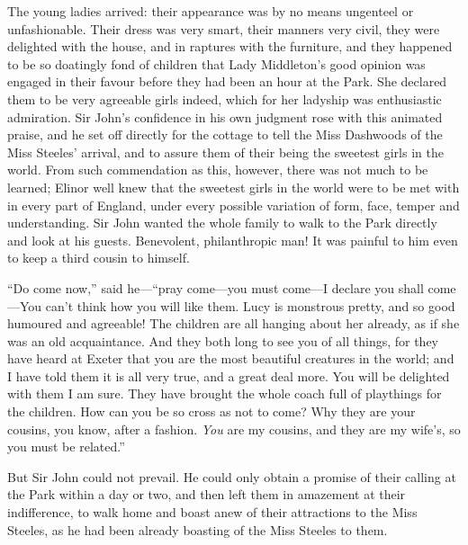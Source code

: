 The young ladies arrived: their appearance was by
no means ungenteel or unfashionable.  Their dress was
very smart, their manners very civil, they were delighted
with the house, and in raptures with the furniture,
and they happened to be so doatingly fond of children
that Lady Middleton's good opinion was engaged in their
favour before they had been an hour at the Park.
She declared them to be very agreeable girls indeed,
which for her ladyship was enthusiastic admiration.
Sir John's confidence in his own judgment rose with this
animated praise, and he set off directly for the cottage
to tell the Miss Dashwoods of the Miss Steeles' arrival,
and to assure them of their being the sweetest girls
in the world.  From such commendation as this, however,
there was not much to be learned; Elinor well knew
that the sweetest girls in the world were to be met
with in every part of England, under every possible
variation of form, face, temper and understanding.
Sir John wanted the whole family to walk to the Park directly
and look at his guests.  Benevolent, philanthropic man!  It
was painful to him even to keep a third cousin to himself.

``Do come now,'' said he---``pray come---you must come---I
declare you shall come---You can't think how you will
like them.  Lucy is monstrous pretty, and so good humoured
and agreeable!  The children are all hanging about her already,
as if she was an old acquaintance.  And they both long
to see you of all things, for they have heard at Exeter
that you are the most beautiful creatures in the world;
and I have told them it is all very true, and a great
deal more.  You will be delighted with them I am sure.
They have brought the whole coach full of playthings
for the children.  How can you be so cross as not to come?
Why they are your cousins, you know, after a fashion.
\emph{You} are my cousins, and they are my wife's, so you must
be related.''

But Sir John could not prevail.  He could only obtain
a promise of their calling at the Park within a day or two,
and then left them in amazement at their indifference,
to walk home and boast anew of their attractions to the
Miss Steeles, as he had been already boasting of the Miss
Steeles to them.

